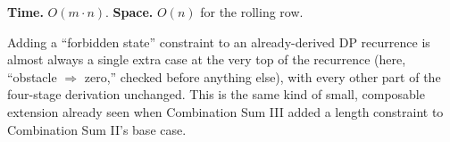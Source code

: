 \begin{complexitybox}
\textbf{Time.} $O(m \cdot n)$.
\textbf{Space.} $O(n)$ for the rolling row.
\end{complexitybox}

\begin{takeawaybox}
Adding a ``forbidden state'' constraint to an already-derived DP
recurrence is almost always a single extra case at the very top of the
recurrence (here, ``obstacle $\Rightarrow$ zero,'' checked before
anything else), with every other part of the four-stage derivation
unchanged. This is the same kind of small, composable extension already
seen when Combination Sum III added a length constraint to Combination
Sum II's base case.
\end{takeawaybox}

